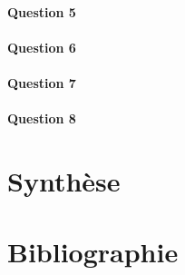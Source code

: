 \documentclass{article}
\begin{document}
\paragraph{Question 5}

\paragraph{Question 6}

\paragraph{Question 7}

\paragraph{Question 8}

\section{Synthèse}

\section{Bibliographie}
\end{document}
